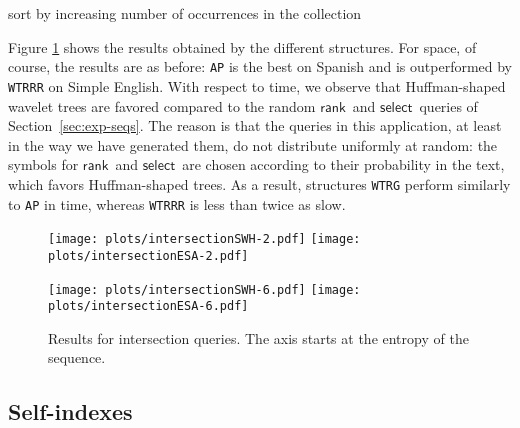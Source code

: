 \documentclass[11pt]{article}
\newcommand{\rank}
    {\ensuremath{\mathsf{rank}}}
\newcommand{\select}
    {\ensuremath{\mathsf{select}}}
\begin{document}
\begin{table}[t]
{\begin{tabular}
\begin{algorithm}[htb]
\Input{}

sort  by increasing number of occurrences in the collection\;
\;
\;
\Return{}
\caption{Retrieving the documents where all  appear.}
\label{alg:intersect}
\end{algorithm}

Figure \ref{fig:inters} shows the results obtained by the different 
structures. For space, of course, the results are as before: \texttt{AP}
is the best on Spanish and is outperformed by \texttt{WTRRR} on Simple
English. With respect to time, we observe that Huffman-shaped wavelet trees
are favored compared to the random \rank\ and \select\ queries of
Section~\ref{sec:exp-seqs}. The reason is that the queries in this 
application, at least in the way we have generated them, do not distribute
uniformly at random: the symbols for \rank\ and \select\ are chosen
according to their probability in the text, which favors Huffman-shaped
trees. As a result, structures \texttt{WTRG} perform similarly to 
\texttt{AP} in time, whereas \texttt{WTRRR} is less than twice as slow.

\begin{figure}[tb]
\centerline{\texttt{[image: plots/intersectionSWH-2.pdf]}
\texttt{[image: plots/intersectionESA-2.pdf]}}

\centerline{\texttt{[image: plots/intersectionSWH-6.pdf]}
\texttt{[image: plots/intersectionESA-6.pdf]}}
\caption{Results for intersection queries. The  axis starts at the entropy of the sequence.}
\label{fig:inters}
\end{figure}

\subsection{Self-indexes}
\label{sec:exp-ssa}


\end{tabular}}
\end{table}
\end{document}
